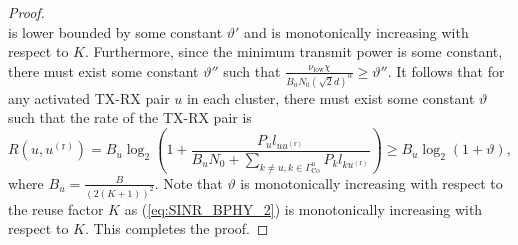 \documentclass[journal,draftclsnofoot,onecolumn,12pt,twoside]{IEEEtran}
\begin{document}
\begin{proof}
\begin{equation}
\end{equation}
is lower bounded by some constant $\vartheta'$ and is monotonically increasing with respect to $K$. Furthermore, since the minimum transmit power is some constant, there must exist some constant $\vartheta''$ such that $\frac{\nu_{\text{low}}\chi}{B_uN_0(\sqrt{2}d)^{\alpha}}\geq \vartheta''$. It follows that for any activated TX-RX pair $u$ in each cluster, there must exist some constant $\vartheta$ such that the rate of the TX-RX pair is
\begin{equation}
R(u,u^{(\text{r})})=B_u\log_2\left(1+\frac{P_ul_{uu^{(\text{r})}}}{B_uN_0+\sum_{k\neq u,k\in\Gamma^u_{\text{Co}}}P_kl_{ku^{(\text{r})}}}\right)\geq B_u\log_2(1+\vartheta),
\end{equation}
where $B_u=\frac{B}{(2(K+1))^2}$. Note that $\vartheta$ is monotonically increasing with respect to the reuse factor $K$ as (\ref{eq:SINR_BPHY_2}) is monotonically increasing with respect to $K$. This completes the proof.
\end{proof}
\end{document}
